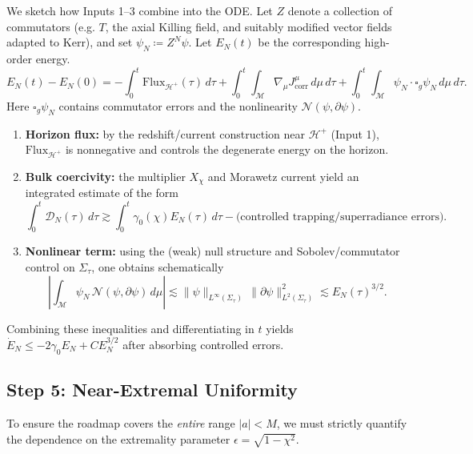 \documentclass[12pt,a4paper]{article}
\begin{document}
We sketch how Inputs 1--3 combine into the ODE. Let $Z$ denote a collection of commutators (e.g. $T$, the axial Killing field, and suitably modified vector fields adapted to Kerr), and set $\psi_N \coloneqq Z^N\psi$. Let $E_N(t)$ be the corresponding high-order energy.
\begin{equation}
E_N(t) - E_N(0)
= -\int_0^t \mathrm{Flux}_{\mathcal{H}^+}(\tau)\,d\tau
    + \int_0^t \int_{\mathcal{M}} \nabla_\mu J^\mu_{\mathrm{corr}}\,d\mu\,d\tau
    + \int_0^t \int_{\mathcal{M}} \psi_N \cdot \square_g \psi_N\,d\mu\,d\tau.
\end{equation}
Here $\square_g\psi_N$ contains commutator errors and the nonlinearity $\mathcal{N}(\psi,\partial\psi)$.
\begin{enumerate}
        \item \textbf{Horizon flux:} by the redshift/current construction near $\mathcal{H}^+$ (Input 1), $\mathrm{Flux}_{\mathcal{H}^+}$ is nonnegative and controls the degenerate energy on the horizon.
        \item \textbf{Bulk coercivity:} the multiplier $X_\chi$ and Morawetz current yield an integrated estimate of the form
        \begin{equation}
        \int_0^t \mathcal{D}_N(\tau)\,d\tau \gtrsim \int_0^t \gamma_0(\chi) E_N(\tau)\,d\tau - \text{(controlled trapping/superradiance errors)}.
        \end{equation}
        \item \textbf{Nonlinear term:} using the (weak) null structure and Sobolev/commutator control on $\Sigma_\tau$, one obtains schematically
        \begin{equation}
        \left|\int_{\mathcal{M}} \psi_N\,\mathcal{N}(\psi,\partial\psi)\,d\mu\right|
        \lesssim \|\psi\|_{L^\infty(\Sigma_\tau)}\,\|\partial\psi\|_{L^2(\Sigma_\tau)}^2
        \lesssim E_N(\tau)^{3/2}.
        \end{equation}
\end{enumerate}
Combining these inequalities and differentiating in $t$ yields $\dot{E}_N \le -2\gamma_0 E_N + C E_N^{3/2}$ after absorbing controlled errors.

\subsection{Step 5: Near-Extremal Uniformity}

To ensure the roadmap covers the \emph{entire} range $|a| < M$, we must strictly quantify the dependence on the extremality parameter $\epsilon = \sqrt{1-\chi^2}$.
\end{document}
